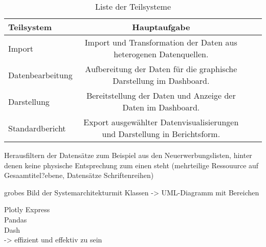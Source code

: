        \begingroup
            \setlength{\tabcolsep}{4pt} %
            \renewcommand{\arraystretch}{1.5}
            \begin{table}[h]
                \centering
                \begin{adjustbox}{max width=\textwidth}
                \Huge
                \begin{tabular}{lccl}
                   \toprule
                   \textbf{Teilsystem}             &{Hauptaufgabe} \\
                   \midrule     
                        Import               &Import und Transformation der Daten aus heterogenen Datenquellen.\\
                        Datenbearbeitung     &Aufbereitung der Daten für die graphische Darstellung im Dashboard.\\
                        Darstellung          &Bereitstellung der Daten und Anzeige der Daten im Dashboard.\\
                        Standardbericht      &Export ausgewählter Datenvisualisierungen und Darstellung in Berichtsform.\\

                    \bottomrule
                \end{tabular}
                \end{adjustbox}
                \caption{%
                    Liste der Teilsysteme
                \label{tab:Teilsysteme}
                }
                 \end{table}
            \endgroup
    



    


Herausfiltern der Datensätze zum Beispiel aus den Neuerwerbungslisten, hinter denen keine physische Entsprechung zum einen steht (mehrteilige Ressouurce auf Gesaamtitel?ebene, Datensätze Schriftenreihen)

    
    
    grobes Bild der Systemarchitekturmit Klassen -> UML-Diagramm mit Bereichen
    
    
    Plotly Express\\
    Pandas\\
    Dash\\
    -> effizient und effektiv zu sein




